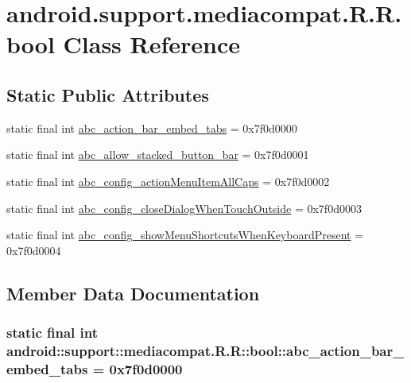 \hypertarget{classandroid_1_1support_1_1mediacompat_1_1_r_1_1bool}{
\section{android.support.mediacompat.R.R.bool Class Reference}
\label{classandroid_1_1support_1_1mediacompat_1_1_r_1_1bool}
}
\subsection*{Static Public Attributes}
\begin{CompactItemize}
\item 
static final int \hyperlink{classandroid_1_1support_1_1mediacompat_1_1_r_1_1bool_ded9e7770ad9ef8b6fada0ef264f08ee}{abc\_\-action\_\-bar\_\-embed\_\-tabs} = 0x7f0d0000
\item 
static final int \hyperlink{classandroid_1_1support_1_1mediacompat_1_1_r_1_1bool_3badd59d69c22853b4c7f67e747e67c9}{abc\_\-allow\_\-stacked\_\-button\_\-bar} = 0x7f0d0001
\item 
static final int \hyperlink{classandroid_1_1support_1_1mediacompat_1_1_r_1_1bool_db8b08471b4f79435d794b58ec6ce6e0}{abc\_\-config\_\-actionMenuItemAllCaps} = 0x7f0d0002
\item 
static final int \hyperlink{classandroid_1_1support_1_1mediacompat_1_1_r_1_1bool_3e8661ef532f33a162cfd5836ef9aa92}{abc\_\-config\_\-closeDialogWhenTouchOutside} = 0x7f0d0003
\item 
static final int \hyperlink{classandroid_1_1support_1_1mediacompat_1_1_r_1_1bool_022eb74f49faacd872ccf2796a0e4790}{abc\_\-config\_\-showMenuShortcutsWhenKeyboardPresent} = 0x7f0d0004
\end{CompactItemize}


\subsection{Member Data Documentation}
\hypertarget{classandroid_1_1support_1_1mediacompat_1_1_r_1_1bool_ded9e7770ad9ef8b6fada0ef264f08ee}{
\subsubsection[{abc\_\-action\_\-bar\_\-embed\_\-tabs}]{\setlength{\rightskip}{0pt plus 5cm}static final int android::support::mediacompat.R.R::bool::abc\_\-action\_\-bar\_\-embed\_\-tabs = 0x7f0d0000}}
\label{classandroid_1_1support_1_1mediacompat_1_1_r_1_1bool_ded9e7770ad9ef8b6fada0ef264f08ee}


